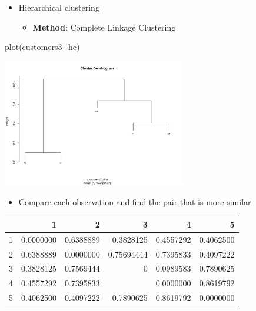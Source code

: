 \documentclass[
  ignorenonframetext,
]{beamer}
\newenvironment{Shaded}{\begin{snugshade}}{\end{snugshade}}
\newcommand{\FunctionTok}[1]{\textcolor[rgb]{0.28,0.35,0.67}{#1}}
\newcommand{\NormalTok}[1]{\textcolor[rgb]{0.00,0.23,0.31}{#1}}
\providecommand{\tightlist}{%
  \setlength{\itemsep}{0pt}\setlength{\parskip}{0pt}}\usepackage{longtable,booktabs,array}
\begin{document}
\begin{frame}[fragile]{}
\label{section-22}
\begin{itemize}
\item
  Hierarchical clustering

  \begin{itemize}
  \tightlist
  \item
    \textbf{Method}: Complete Linkage Clustering
  \end{itemize}
\end{itemize}

\tiny

\begin{Shaded}
\begin{Highlighting}[]
\FunctionTok{plot}\NormalTok{(customers3\_hc)}
\end{Highlighting}
\end{Shaded}

\begin{center}
\includegraphics[width=0.6\textwidth,height=\textheight]{011_segmentation_clustering_files/figure-beamer/unnamed-chunk-15-1.pdf}
\end{center}
\end{frame}

\begin{frame}{}
\label{section-23}
\begin{itemize}
\tightlist
\item
  Compare each observation and find the pair that is more similar
\end{itemize}

\begin{table}
\centering
\begin{tabular}[t]{rrrrrr}
\toprule
  & 1 & 2 & 3 & 4 & 5\\
\midrule
1 & 0.0000000 & 0.6388889 & 0.3828125 & 0.4557292 & 0.4062500\\
2 & 0.6388889 & 0.0000000 & 0.75694444 & 0.7395833 & 0.4097222\\
3 & 0.3828125 & 0.7569444 & 0 & 0.0989583 & 0.7890625\\
4 & 0.4557292 & 0.7395833 & \cellcolor[HTML]{2C3E50}{\textcolor{white}{0.09895833}} & 0.0000000 & 0.8619792\\
5 & 0.4062500 & 0.4097222 & 0.7890625 & 0.8619792 & 0.0000000\\
\bottomrule
\end{tabular}
\end{table}
\end{frame}
\end{document}
